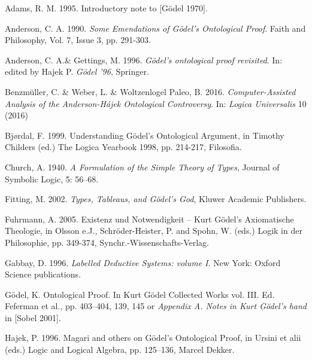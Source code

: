 \documentclass[smallextended]{svjour3}
\begin{document}


\begin{thebibliography}{9}

Adams, R. M. 1995. Introductory note to [G\"odel 1970]. 

Anderson, C. A. 1990. {\itshape Some Emendations of G\"odel's Ontological Proof}. Faith and Philosophy, Vol. 7, Issue 3, pp. 291-303. 

Anderson, C. A.\& Gettings, M. 1996.  {\itshape G\"odel's ontological proof revisited}. In: edited by Hajek P. {\itshape G\"odel '96},  Springer. 

Benzm\"uller, C. \& Weber, L. \& Woltzenlogel Paleo, B. 2016. {\itshape Computer-Assisted Analysis of the Anderson-H\'ajek Ontological Controversy}. In: {\itshape Logica Universalis} 10 (2016)


Bj{\o}rdal, F. 1999. Understanding G\"odel's Ontological Argument, in Timothy Childers (ed.) The Logica Yearbook 1998, pp. 214-217, Filosofia.

Church, A. 1940. {\itshape A Formulation of the Simple Theory of Types}, Journal of Symbolic Logic, 5: 56--68. 

Fitting, M. 2002.  {\itshape Types, Tableaus, and G\"odel's God}, Kluwer Academic Publishers.  

Fuhrmann, A. 2005.
Existenz und Notwendigkeit -- Kurt G\"odel's Axiomatische Theologie, in Olsson e.J., Schr\"oder-Heister, P. and Spohn, W. (eds.) Logik in der Philosophie, pp. 349-374, Synchr.-Wissenschafts-Verlag.

Gabbay, D. 1996. {\itshape Labelled Deductive Systems: volume I}. New York: Oxford Science publications. 

G\"odel, K. Ontological Proof. In Kurt G\"odel Collected Works vol. III. Ed. Feferman et al., pp. 403--404, 139, 145 or {\itshape Appendix A. Notes in Kurt G\"odel's hand} in [Sobel 2001]. 

Hajek, P. 1996. Magari and others on G\"odel's Ontological Proof, in Ursini et alii
(eds.) Logic and Logical Algebra, pp. 125--136, Marcel Dekker.


\end{thebibliography}
\end{document}
